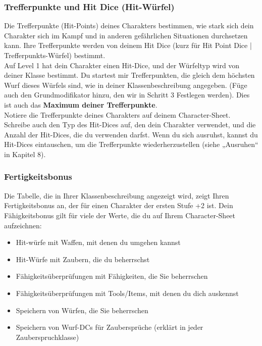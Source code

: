 \subsubsection{Trefferpunkte und Hit Dice (Hit-Würfel)}
Die Trefferpunkte (Hit-Points) deines Charakters bestimmen, wie stark sich dein Charakter sich im Kampf und in anderen gefährlichen Situationen durchsetzen kann. Ihre Trefferpunkte werden von deinem Hit Dice (kurz für Hit Point Dice | Trefferpunkts-Würfel) bestimmt.\\
Auf Level 1 hat dein Charakter einen Hit-Dice, und der Würfeltyp wird von deiner Klasse bestimmt.
Du startest mir Trefferpunkten, die gleich dem höchsten Wurf dieses Würfels sind, wie in deiner Klassenbeschreibung angegeben. (Füge auch den Grundmodifikator hinzu, den wir in Schritt 3 Festlegen werden). Dies ist auch das \textbf{Maximum deiner Trefferpunkte}.\\
Notiere die Trefferpunkte deines Charakters auf deinem Character-Sheet. Schreibe auch den Typ des Hit-Dices auf, den dein Charakter verwendet, und die Anzahl der Hit-Dices, die du verwenden darfst. Wenn du sich ausruhst, kannst du Hit-Dices eintauschen, um die Trefferpunkte wiederherzustellen (siehe „Ausruhen“ in Kapitel 8).

\subsubsection{Fertigkeitsbonus}
Die Tabelle, die in Ihrer Klassenbeschreibung angezeigt wird, zeigt Ihren Fertigkeitsbonus an, der für einen Charakter der ersten Stufe +2 ist. Dein Fähigkeitsbonus gilt für viele der Werte, die du auf Ihrem Character-Sheet aufzeichnen:
\begin{itemize}
	\item Hit-würfe mit Waffen, mit denen du umgehen kannst
	\item Hit-Würfe mit Zaubern, die du beherrschst
	\item Fähigkeitsüberprüfungen mit Fähigkeiten, die Sie beherrschen
	\item Fähigkeitsüberprüfungen mit Tools/Items, mit denen du dich auskennst
	\item Speichern von Würfen, die Sie beherrschen
	\item Speichern von Wurf-DCs für Zaubersprüche (erklärt in jeder Zauberspruchklasse)
\end{itemize}

